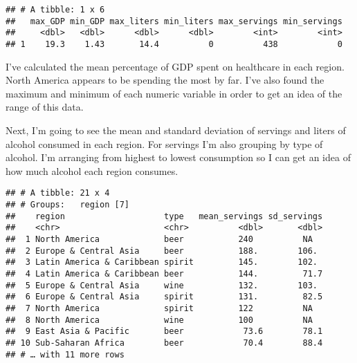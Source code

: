 \documentclass[]{article}
\newenvironment{Shaded}{\begin{snugshade}}{\end{snugshade}}
\newcommand{\KeywordTok}[1]{\textcolor[rgb]{0.13,0.29,0.53}{\textbf{#1}}}
\newcommand{\DataTypeTok}[1]{\textcolor[rgb]{0.13,0.29,0.53}{#1}}
\newcommand{\OperatorTok}[1]{\textcolor[rgb]{0.81,0.36,0.00}{\textbf{#1}}}
\newcommand{\NormalTok}[1]{#1}
\begin{document}
\begin{Shaded}
\end{Shaded}

\begin{verbatim}
## # A tibble: 1 x 6
##   max_GDP min_GDP max_liters min_liters max_servings min_servings
##     <dbl>   <dbl>      <dbl>      <dbl>        <int>        <int>
## 1    19.3    1.43       14.4          0          438            0
\end{verbatim}

I've calculated the mean percentage of GDP spent on healthcare in each
region. North America appears to be spending the most by far. I've also
found the maximum and minimum of each numeric variable in order to get
an idea of the range of this data.

Next, I'm going to see the mean and standard deviation of servings and
liters of alcohol consumed in each region. For servings I'm also
grouping by type of alcohol. I'm arranging from highest to lowest
consumption so I can get an idea of how much alcohol each region
consumes.

\begin{Shaded}
\end{Shaded}

\begin{verbatim}
## # A tibble: 21 x 4
## # Groups:   region [7]
##    region                    type   mean_servings sd_servings
##    <chr>                     <chr>          <dbl>       <dbl>
##  1 North America             beer           240          NA  
##  2 Europe & Central Asia     beer           188.        106. 
##  3 Latin America & Caribbean spirit         145.        102. 
##  4 Latin America & Caribbean beer           144.         71.7
##  5 Europe & Central Asia     wine           132.        103. 
##  6 Europe & Central Asia     spirit         131.         82.5
##  7 North America             spirit         122          NA  
##  8 North America             wine           100          NA  
##  9 East Asia & Pacific       beer            73.6        78.1
## 10 Sub-Saharan Africa        beer            70.4        88.4
## # … with 11 more rows
\end{verbatim}
\end{document}
